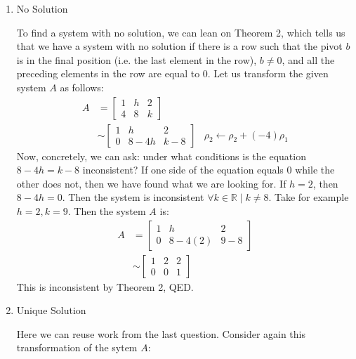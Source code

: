 \documentclass[10pt,letterpaper,final]{report}
\begin{document}
\begin{enumerate}
  \item No Solution

        To find a system with no solution, we can lean on Theorem 2, which tells us that we have a system with no solution if there is a row such that the pivot $b$ is in the final position (i.e. the last element in the row), $b \ne 0$, and all the preceding elements in the row are equal to $0$. Let us transform the given system $A$ as follows:
        \begin{align*}
          A & =
          \left[\begin{array}{rr|r}
              1 & h & 2 \\
              4 & 8 & k
            \end{array}\right]
          \\[6pt]
            & \sim
          \left[\begin{array}{rr|r}
              1 & h    & 2   \\
              0 & 8-4h & k-8
            \end{array}\right]
            & \rho_2 \leftarrow \rho_2 + (-4)\rho_1
        \end{align*}
        Now, concretely, we can ask: under what conditions is the equation $8 - 4h = k - 8$ inconsistent? If one side of the equation equals $0$ while the other does not, then we have found what we are looking for. If $h = 2$, then $8 - 4h = 0$. Then the system is inconsistent $\forall k \in \mathbb{R} \mid k \ne 8$. Take for example $h=2, k=9$. Then the system $A$ is:
        \begin{align*}
          A & =
          \left[\begin{array}{rr|r}
              1 & h      & 2   \\
              0 & 8-4(2) & 9-8
            \end{array}\right]
          \\[6pt]
            & \sim
          \left[\begin{array}{rr|r}
              1 & 2 & 2 \\
              0 & 0 & 1
            \end{array}\right]
        \end{align*}
        This is inconsistent by Theorem 2, QED.

  \item Unique Solution

        Here we can reuse work from the last question. Consider again this transformation of the sytem $A$:


\end{enumerate}
\end{document}
